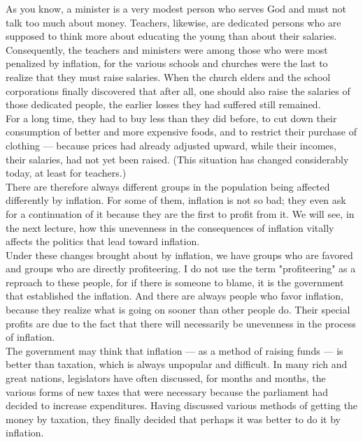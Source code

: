 \documentclass[a4paper]{article}
\begin{document}
As you know, a minister is a very modest person who serves God and must not 
talk too much about money. Teachers, likewise, are dedicated persons who are 
supposed to think more about educating the young than about their salaries. 
Consequently, the teachers and ministers were among those who were most 
penalized by inflation, for the various schools and churches were the last to 
realize that they must raise salaries. When the church elders and the school 
corporations finally discovered that after all, one should also raise the 
salaries of those dedicated people, the earlier losses they had suffered still 
remained.\\

For a long time, they had to buy less than they did before, to cut down their 
consumption of better and more expensive foods, and to restrict their purchase 
of clothing — because prices had already adjusted upward, while their incomes, 
their salaries, had not yet been raised. (This situation has changed 
considerably today, at least for teachers.)\\

There are therefore always different groups in the population being affected 
differently by inflation. For some of them, inflation is not so bad; they even 
ask for a continuation of it because they are the first to profit from it. We 
will see, in the next lecture, how this unevenness in the consequences of 
inflation vitally affects the politics that lead toward inflation.\\

Under these changes brought about by inflation, we have groups who are favored 
and groups who are directly profiteering. I do not use the term "profiteering" 
as a reproach to these people, for if there is someone to blame, it is the 
government that established the inflation. And there are always people who 
favor inflation, because they realize what is going on sooner than other people
do. Their special profits are due to the fact that there will necessarily be 
unevenness in the process of inflation.\\

The government may think that inflation — as a method of raising funds — is 
better than taxation, which is always unpopular and difficult. In many rich and
great nations, legislators have often discussed, for months and months, the 
various forms of new taxes that were necessary because the parliament had 
decided to increase expenditures. Having discussed various methods of getting 
the money by taxation, they finally decided that perhaps it was better to do it
by inflation.\\
\end{document}
